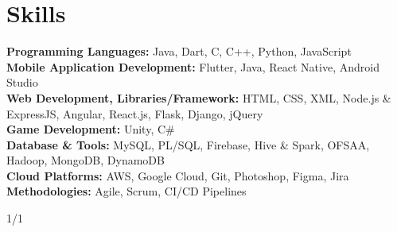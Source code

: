 \documentclass[10pt, legalpaper]{article}
\newenvironment{onecolentry}{
    \par\noindent
}{
    \par
}
\begin{document}
\section{Skills}
\begin{onecolentry}

\textbf{Programming Languages:} Java, Dart, C, C++, Python, JavaScript \\
\textbf{Mobile Application Development:} Flutter, Java, React Native, Android Studio \\
\textbf{Web Development, Libraries/Framework:} HTML, CSS, XML, Node.js \& ExpressJS, Angular, React.js, Flask, Django, jQuery \\
\textbf{Game Development:} Unity, C\# \\
\textbf{Database \& Tools:} MySQL, PL/SQL, Firebase, Hive \& Spark, OFSAA, Hadoop, MongoDB, DynamoDB \\
\textbf{Cloud Platforms:} AWS, Google Cloud, Git, Photoshop, Figma, Jira \\
\textbf{Methodologies:} Agile, Scrum, CI/CD Pipelines

\end{onecolentry}

\vspace{0.5 cm}
\begin{onecolentry}
    \centering
    {1/1}
\end{onecolentry}
\end{document}
